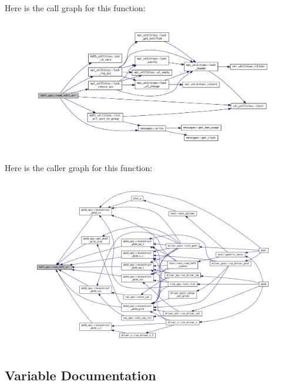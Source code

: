 Here is the call graph for this function\+:\nopagebreak
\begin{figure}[H]
\begin{center}
\leavevmode
\includegraphics[width=350pt]{namespacehdf5__ops_a5108e0d6f6b492cb981505ebceedd9ee_cgraph}
\end{center}
\end{figure}
Here is the caller graph for this function\+:\nopagebreak
\begin{figure}[H]
\begin{center}
\leavevmode
\includegraphics[width=350pt]{namespacehdf5__ops_a5108e0d6f6b492cb981505ebceedd9ee_icgraph}
\end{center}
\end{figure}


\subsection{Variable Documentation}
\mbox{\label{namespacehdf5__ops_a9b7c63811a63e9454539f1a2c89678b4}} 
